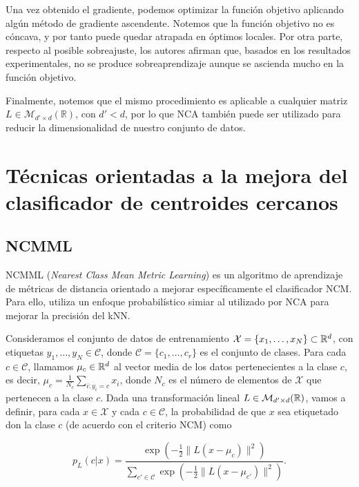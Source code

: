 \documentclass{book}
\begin{document}
Una vez obtenido el gradiente, podemos optimizar la función objetivo aplicando algún método de gradiente ascendente. Notemos que la función objetivo no es cóncava, y por tanto puede quedar atrapada en óptimos locales. Por otra parte, respecto al posible sobreajuste, los autores afirman que, basados en los resultados experimentales, no se produce sobreaprendizaje aunque se ascienda mucho en la función objetivo.

Finalmente, notemos que el mismo procedimiento es aplicable a cualquier matriz $L \in \mathcal{M}_{d'\times d}(\mathbb{R})$, con $d' < d$, por lo que NCA también puede ser utilizado para reducir la dimensionalidad de nuestro conjunto de datos.


\section{Técnicas orientadas a la mejora del clasificador de centroides cercanos}

\subsection{NCMML}

NCMML (\emph{Nearest Class Mean Metric Learning}) \cite{ncmml} es un algoritmo de aprendizaje de métricas de distancia orientado a mejorar específicamente el clasificador NCM. Para ello, utiliza un enfoque probabilístico simiar al utilizado por NCA para mejorar la precisión del kNN.

Consideramos el conjunto de datos de entrenamiento $\mathcal{X} = \{x_1,\dots,x_N\} \subset \mathbb{R}^d$, con etiquetas $y_1,\dots,y_N \in \mathcal{C}$, donde $\mathcal{C} = \{c_1,\dots,c_r\}$ es el conjunto de clases. Para cada $c \in \mathcal{C}$, llamamos $\mu_c \in \mathbb{R}^d$ al vector media de los datos pertenecientes a la clase $c$, es decir, $\mu_c = \frac{1}{N_c}\sum_{i\colon y_i = c}x_i$, donde $N_c$ es el número de elementos de $\mathcal{X}$ que pertenecen a la clase $c$. Dada una transformación lineal $L \in \mathcal{M}_{d'\times d}(\mathbb{R})$, vamos a definir, para cada $x \in \mathcal{X}$ y cada $c \in \mathcal{C}$, la probabilidad de que $x$ sea etiquetado don la clase $c$ (de acuerdo con el criterio NCM) como

\begin{equation}
	p_L(c|x) = \frac{\exp\left(-\frac{1}{2} \|L(x - \mu_c)\|^2\right)}{\sum\limits_{c' \in \mathcal{C}} \exp\left(-\frac{1}{2} \|L(x - \mu_{c'})\|^2\right)}.
\end{equation} 
\end{document}
